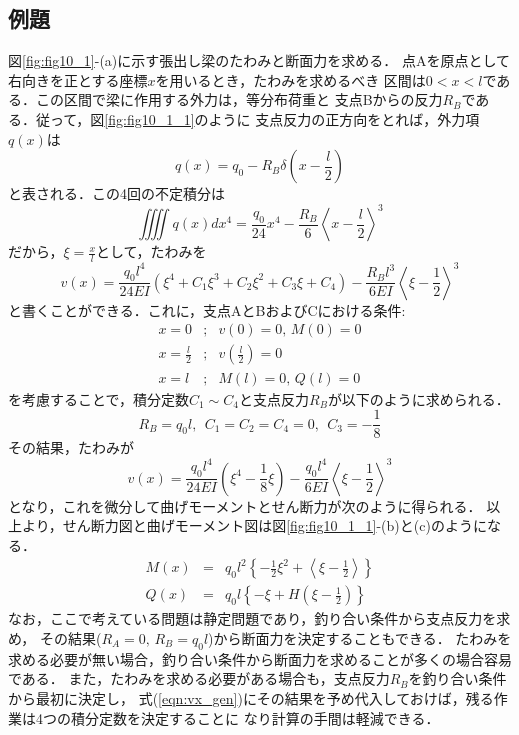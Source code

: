 \documentclass[10pt,a4j]{jbook}
\begin{document}
\subsection{例題}
図\ref{fig:fig10_1}-(a)に示す張出し梁のたわみと断面力を求める．
点Aを原点として右向きを正とする座標$x$を用いるとき，たわみを求めるべき
区間は$0<x<l$である．この区間で梁に作用する外力は，等分布荷重と
支点Bからの反力$R_B$である．従って，図\ref{fig:fig10_1_1}のように
支点反力の正方向をとれば，外力項$q(x)$は
\begin{equation}
	q(x)=q_0-R_B\delta\left(x-\frac{l}{2}\right)
	\label{eqn:qx}
\end{equation}
と表される．この4回の不定積分は
\begin{equation}
	\iiiint q(x) dx^4= \frac{q_0}{24}x^4-\frac{R_B}{6}\left<x-\frac{l}{2}\right>^3
	\label{eqn:int_qx4}
\end{equation}
だから，$\xi=\frac{x}{l}$として，たわみを
\begin{equation}
	v(x)=\frac{q_0l^4}{24EI}\left( \xi^4+C_1\xi^3 +C_2\xi^2+C_3\xi+C_4\right)
	-
	\frac{R_Bl^3}{6EI}\left< \xi-\frac{1}{2}\right>^3
	\label{eqn:vx_gen}
\end{equation}
と書くことができる．これに，支点AとBおよびCにおける条件:
\begin{eqnarray}
	x=0 &;& v(0)=0, \, M(0)=0 
	\\
	x=\frac{l}{2} &;& v\left( \frac{l}{2} \right)=0
	\\
	x=l &;& M(l)=0,\, Q(l)=0
\end{eqnarray}
を考慮することで，積分定数$C_1\sim C_4$と支点反力$R_B$が以下のように求められる．
\begin{equation}
	R_B=q_0l, \ \ C_1=C_2=C_4=0, \ \ C_3=-\frac{1}{8}
\end{equation}
その結果，たわみが
\begin{equation}
	v(x)=\frac{q_0l^4}{24EI}\left( \xi^4-\frac{1}{8}\xi\right)
	-
	\frac{q_0l^4}{6EI}\left< \xi-\frac{1}{2}\right>^3
	\label{eqn:vx}
\end{equation}
となり，これを微分して曲げモーメントとせん断力が次のように得られる．
以上より，せん断力図と曲げモーメント図は図\ref{fig:fig10_1_1}-(b)と(c)のようになる．
\begin{eqnarray}
	M(x)&=&
	q_0l^2 \left\{ -\frac{1}{2}\xi^2 + \left< \xi -\frac{1}{2}\right> \right\}
	\\
	Q(x)&=&
	q_0l \left\{-\xi+H\left(\xi-\frac{1}{2}\right)\right\}
\end{eqnarray}
なお，ここで考えている問題は静定問題であり，釣り合い条件から支点反力を求め，
その結果($R_A=0,\, R_B=q_0l$)から断面力を決定することもできる．
たわみを求める必要が無い場合，釣り合い条件から断面力を求めることが多くの場合容易である．
また，たわみを求める必要がある場合も，支点反力$R_B$を釣り合い条件から最初に決定し，
式(\ref{eqn:vx_gen})にその結果を予め代入しておけば，残る作業は4つの積分定数を決定することに
なり計算の手間は軽減できる．
\end{document}

